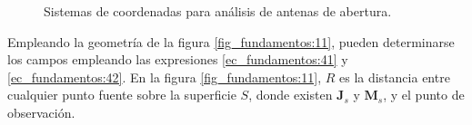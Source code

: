 \begin{figure} [H]
\centering 
{}
\caption{Sistemas de coordenadas para análisis de antenas de abertura.}
\label{grup_fig_fundamentos:5}
\end{figure}
Empleando la geometría de la figura \ref{fig_fundamentos:11}, pueden determinarse los campos empleando las expresiones \eqref{ec_fundamentos:41} y \eqref{ec_fundamentos:42}. En la figura \ref{fig_fundamentos:11}, $R$ es la distancia entre cualquier punto fuente sobre la superficie $S$, donde existen $\mathbf{J}_s$ y $\mathbf{M}_s$, y el punto de observación.

